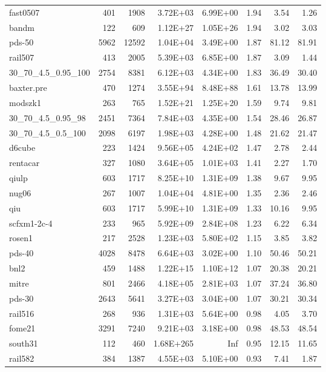\documentclass[10pt]{article}
\begin{document}
\begin{longtable}{|l|r|r|r|r|r|r|r|}
fast0507	&	401	&	1908	&	3.72E+03	&	6.99E+00	&	1.94	&	3.54	&	1.26	\\
bandm	&	122	&	609	&	1.12E+27	&	1.05E+26	&	1.94	&	3.02	&	3.03	\\
pds-50	&	5962	&	12592	&	1.04E+04	&	3.49E+00	&	1.87	&	81.12	&	81.91	\\
rail507	&	413	&	2005	&	5.39E+03	&	6.85E+00	&	1.87	&	3.09	&	1.44	\\
30\_70\_4.5\_0.95\_100	&	2754	&	8381	&	6.12E+03	&	4.34E+00	&	1.83	&	36.49	&	30.40	\\
baxter.pre	&	470	&	1274	&	3.55E+94	&	8.48E+88	&	1.61	&	13.78	&	13.99	\\
modszk1	&	263	&	765	&	1.52E+21	&	1.25E+20	&	1.59	&	9.74	&	9.81	\\
30\_70\_4.5\_0.95\_98	&	2451	&	7364	&	7.84E+03	&	4.35E+00	&	1.54	&	28.46	&	26.87	\\
30\_70\_4.5\_0.5\_100	&	2098	&	6197	&	1.98E+03	&	4.28E+00	&	1.48	&	21.62	&	21.47	\\
d6cube	&	223	&	1424	&	9.56E+05	&	4.24E+02	&	1.47	&	2.78	&	2.44	\\
rentacar	&	327	&	1080	&	3.64E+05	&	1.01E+03	&	1.41	&	2.27	&	1.70	\\
qiulp	&	603	&	1717	&	8.25E+10	&	1.31E+09	&	1.38	&	9.67	&	9.95	\\
nug06	&	267	&	1007	&	1.04E+04	&	4.81E+00	&	1.35	&	2.36	&	2.46	\\
qiu	&	603	&	1717	&	5.99E+10	&	1.31E+09	&	1.33	&	10.16	&	9.95	\\
scfxm1-2c-4	&	233	&	965	&	5.92E+09	&	2.84E+08	&	1.23	&	6.22	&	6.34	\\
rosen1	&	217	&	2528	&	1.23E+03	&	5.80E+02	&	1.15	&	3.85	&	3.82	\\
pds-40	&	4028	&	8478	&	6.64E+03	&	3.02E+00	&	1.10	&	50.46	&	50.21	\\
bnl2	&	459	&	1488	&	1.22E+15	&	1.10E+12	&	1.07	&	20.38	&	20.21	\\
mitre	&	801	&	2466	&	4.18E+05	&	2.81E+03	&	1.07	&	37.24	&	36.80	\\
pds-30	&	2643	&	5641	&	3.27E+03	&	3.04E+00	&	1.07	&	30.21	&	30.34	\\
rail516	&	268	&	936	&	1.31E+03	&	5.64E+00	&	0.98	&	4.05	&	3.70	\\
fome21	&	3291	&	7240	&	9.21E+03	&	3.18E+00	&	0.98	&	48.53	&	48.54	\\
south31	&	112	&	460	&	1.68E+265	&	Inf	&	0.95	&	12.15	&	11.65	\\
rail582	&	384	&	1387	&	4.55E+03	&	5.10E+00	&	0.93	&	7.41	&	1.87	\\

\end{longtable}
\end{document}
